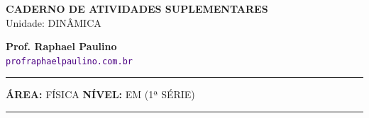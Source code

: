 \documentclass[twoside, 10pt, a4paper]{article}
\begin{document}
\thispagestyle{empty}
\color{Cinzablack}
\vspace*{-1.8cm}

\noindent
\begin{minipage}{\textwidth}
    \selectfont
    \noindent
    \begin{minipage}[t]{0.70\linewidth}
        {\Large \bfseries \MakeUppercase{Caderno de Atividades Suplementares}}\\[0.1cm]
        {\large \textmd{\textcolor{CinzaEscuro}{Unidade: DINÂMICA}}}
    \end{minipage}%
    \begin{minipage}[t]{0.30\linewidth}
        \raggedleft
        \small \textbf{Prof. Raphael Paulino}\\
        \textsf{\small \textcolor{indigo}{\texttt{profraphaelpaulino.com.br}}}
    \end{minipage}
    
    \vspace{0.15cm}
    \noindent\rule{\linewidth}{1.2pt}
    \vspace{-0.1cm}
    \footnotesize\textsf{\textbf{ÁREA:} FÍSICA \hfill \textbf{NÍVEL:} EM (1ª SÉRIE)}
    \vspace{0.1cm}
    \noindent\rule{\linewidth}{0.4pt}
\end{minipage}
\end{document}
